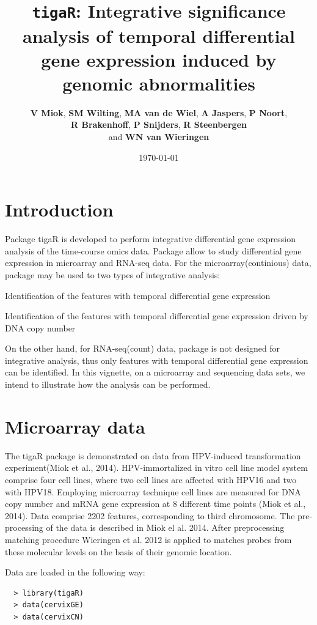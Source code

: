 \documentclass[a4paper]{article}
\date{}
\title{{\tt tigaR}: Integrative significance analysis of temporal differential gene expression induced by genomic abnormalities}
\date{\today}
\author{\textbf{V Miok}, \textbf{SM Wilting}, \textbf{MA van de Wiel}, \textbf{A Jaspers}, \textbf{P Noort},\\
 \textbf{R Brakenhoff}, \textbf{P Snijders}, \textbf{R Steenbergen} \\ and \textbf{WN van Wieringen}}
\begin{document}
\maketitle

\section{Introduction}

Package tigaR is developed to perform integrative differential gene expression analysis of the time-course omics data. Package allow to study differential gene expression in microarray and RNA-seq data. For the microarray(continious) data, package may be used to two types of integrative analysis:
\begin{compactitem}
\item Identification of the features with temporal differential gene expression 
\item Identification of the features with temporal differential gene expression driven by DNA copy number
\end{compactitem}
On the other hand, for RNA-seq(count) data, package is not designed for integrative analysis, thus only features with temporal differential gene expression can be identified. In this vignette, on a microarray and sequencing data sets, we intend to illustrate how the analysis can be performed.

\section{Microarray data}

The tigaR package is demonstrated on data from HPV-induced transformation experiment(Miok et al., 2014). HPV-immortalized in vitro cell line model system comprise four cell lines, where two cell lines are affected with HPV16 and two with HPV18. Employing microarray technique cell lines are measured for DNA copy number and mRNA gene expression at 8 different time points (Miok et al., 2014). Data comprise 2202 features, corresponding to third chromosome. The pre-processing of the data is described in Miok el al. 2014. After preprocessing matching procedure Wieringen et al. 2012 is applied to matches probes from these molecular levels on the basis of their genomic location.

Data are loaded in the following way:
\begin{verbatim}
  > library(tigaR)
  > data(cervixGE)
  > data(cervixCN)
\end{verbatim}
\end{document}
